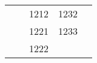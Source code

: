 \begin{table}[all_orders]
\begin{tabular}{@{}|l|l|lll@{}}
                                              &                                           & 1212                     & \multicolumn{1}{|l|}{1232}                 & \multicolumn{1}{l|}{}                      \\
                                              &                                           & 1221                     & \multicolumn{1}{|l|}{1233}                 & \multicolumn{1}{l|}{}                      \\
                                              &                                           & 1222                     & \multicolumn{1}{|l|}{}                     & \multicolumn{1}{l|}{}                      \\ \bottomrule
   \end{tabular}
\end{table}



